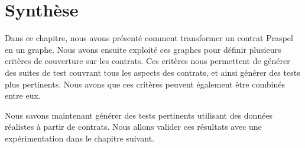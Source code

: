 \section{Synthèse}
\label{section:test:summary}

Dans ce chapitre, nous avons présenté comment transformer un contrat Praspel en
un graphe. Nous avons ensuite exploité ces graphes pour définir plusieurs
critères de couverture sur les contrats. Ces critères nous permettent de générer
des suites de test couvrant tous les aspects des contrats, et ainsi générer des
tests plus pertinents. Nous avons que ces critères peuvent également être
combinés entre eux.

Nous savons maintenant générer des tests pertinents utilisant des données
réalistes à partir de contrats. Nous allons valider ces résultats avec une
expérimentation dans le chapitre suivant.
